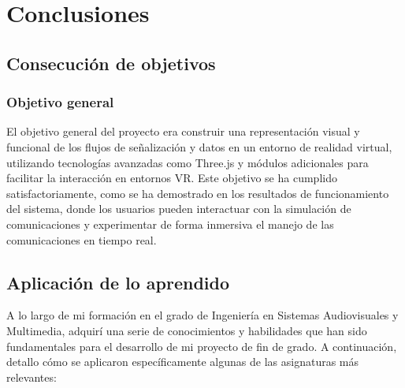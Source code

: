 \documentclass[a4paper, 12pt]{book}
\begin{document}

\cleardoublepage
\chapter{Conclusiones}
\label{chap:conclusiones}


\section{Consecución de objetivos}
\label{sec:consecucion-objetivos}

\subsection{Objetivo general}
El objetivo general del proyecto era construir una representación visual y funcional de los flujos de señalización y 
datos en un entorno de realidad virtual, utilizando tecnologías avanzadas como Three.js y módulos adicionales para facilitar 
la interacción en entornos VR. Este objetivo se ha cumplido satisfactoriamente, como se ha demostrado en los resultados de funcionamiento 
del sistema, donde los usuarios pueden interactuar con la simulación de comunicaciones y experimentar de forma inmersiva el manejo de 
las comunicaciones en tiempo real.


\section{Aplicación de lo aprendido}
\label{sec:aplicacion}

A lo largo de mi formación en el grado de Ingeniería en Sistemas Audiovisuales y Multimedia, adquirí una serie de conocimientos y 
habilidades que han sido fundamentales para el desarrollo de mi proyecto de fin de grado. A continuación, detallo cómo se aplicaron 
específicamente algunas de las asignaturas más relevantes:
\end{document}
